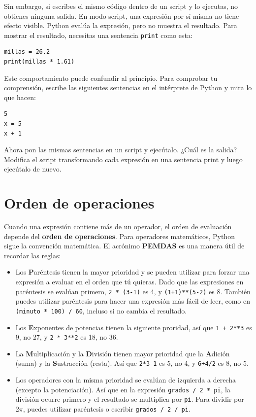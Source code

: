 \documentclass[10pt]{book}
\begin{document}
Sin embargo, si escribes el mismo código dentro de un script y lo ejecutas, no obtienes
ninguna salida.
En modo script, una expresión por sí misma no tiene
efecto visible.  Python evalúa la expresión, pero no
muestra el resultado.
Para mostrar el resultado, necesitas una sentencia {\tt print} como esta:

\begin{verbatim}
millas = 26.2
print(millas * 1.61)
\end{verbatim}

Este comportamiento puede confundir al principio.
Para comprobar tu comprensión, escribe las siguientes sentencias en el
intérprete de Python y mira lo que hacen:

\begin{verbatim}
5
x = 5
x + 1
\end{verbatim}

Ahora pon las mismas sentencias en un script y ejecútalo.  ¿Cuál
es la salida?  Modifica el script transformando cada
expresión en una sentencia print y luego ejecútalo de nuevo.

\section{Orden de operaciones}

Cuando una expresión contiene más de un operador, el orden de
evaluación depende del {\bf orden de operaciones}.  Para
operadores matemáticos, Python sigue la convención matemática.
El acrónimo {\bf PEMDAS} es una manera útil de
recordar las reglas:

\begin{itemize}

\item Los {\bf P}aréntesis tienen la mayor prioridad y se pueden utilizar 
para forzar una expresión a evaluar en el orden que tú quieras. Dado que
las expresiones en paréntesis se evalúan primero, {\tt 2 * (3-1)} es 4,
y {\tt (1+1)**(5-2)} es 8. También puedes utilizar paréntesis para hacer una
expresión más fácil de leer, como en {\tt (minuto * 100) / 60}, incluso
si no cambia el resultado.

\item Los {\bf E}xponentes de potencias tienen la siguiente proridad, así que
{\tt 1 + 2**3} es 9, no 27, y {\tt 2 * 3**2} es 18, no 36.

\item La {\bf M}ultiplicación y la {\bf D}ivisión tienen mayor prioridad
	que la {\bf A}dición (suma) y la {\bf S}ustracción (resta).  Así que {\tt 2*3-1} es 5, no
  4, y {\tt 6+4/2} es 8, no 5.

\item Los operadores con la misma prioridad se evalúan de izquierda a
  derecha (excepto la potenciación).  Así que en la expresión {\tt grados /
    2 * pi}, la división ocurre primero y el resultado se multiplica
  por {\tt pi}.  Para dividir por $2 \pi$, puedes utilizar paréntesis o escribir
  {\tt grados / 2 / pi}.

\end{itemize}
\end{document}
